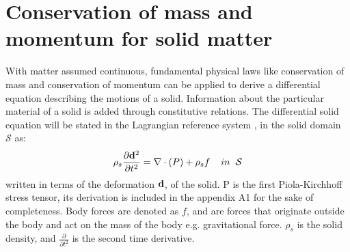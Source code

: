 \section{Conservation of mass and momentum for solid matter}
With matter assumed continuous, fundamental physical laws like conservation of mass and conservation of momentum can be applied to derive a differential equation describing the motions of a solid. Information about the particular material of a solid is added through constitutive relations.
The differential solid equation will be stated in the Lagrangian reference system \cite{Holzapfel2000}, in the solid domain $\mathcal{S}$ as:
\begin{equation}\label{eq:Solid}
\rho_s \frac{\partial \bold{d}^2}{\partial t^2} = \nabla \cdot ( P ) + \rho_s f  \hspace{4mm} in \hspace{2mm} \mathcal{S}
\end{equation}
written in terms of the deformation $\bold{d}$, of the solid.
P is the first Piola-Kirchhoff stress tensor, its derivation is included in the appendix A1 for the sake of completeness.
Body forces are denoted as $f$, and are forces that originate outside the body and act on the mass of the body e.g. gravitational force. $\rho_s$ is the solid density, and $\frac{\partial}{\partial t^2}$ is the second time derivative. 

\begin{comment}
\subsection*{Locking}
The problem og shear locking can happen FEM computations with certain elements. 
[mek4250 Kent] - Locking occurs if  $ \lambda >> \nu $ that is, the material is nearly incompressible. The reason is that all the elements discussed in this course are poor at approximating the divergence. Locking refers to the case where the displacement is to small because the divergence term essentially lock the displacement. It is a numerical artifact not a physical feature. [Verbatum]
\end{comment}
